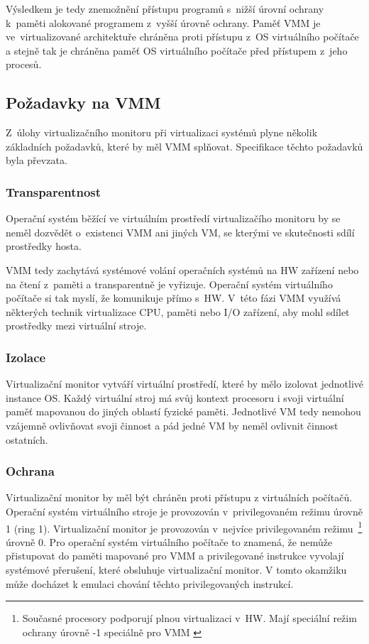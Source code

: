 Výsledkem je tedy znemožnění přístupu programů s~nižší úrovní ochrany k~paměti alokované programem z~vyšší úrovně ochrany.
Paměť VMM je ve~virtualizované architektuře chráněna proti přístupu z~OS virtuálního počítače a stejně tak je chráněna paměť
OS virtuálního počítače před přístupem z~jeho procesů.
\subsection{Požadavky na VMM}
\label{chapter:virtualization:vmm:demands}
Z~úlohy virtualizačního monitoru při virtualizaci systémů plyne několik základních požadavků, které by měl VMM splňovat.
Specifikace \cite{cvut:presentation:virt2} těchto požadavků byla převzata.
\subsubsection{Transparentnost}
\label{chapter:virtualization:vmm:demands:transparency}
Operační systém běžící ve virtuálním prostředí virtualizačího monitoru by se neměl dozvědět o~existenci VMM ani jiných VM,
se kterými ve skutečnosti sdílí prostředky hosta.

VMM tedy zachytává systémové volání operačních systémů na HW zařízení nebo na čtení z~paměti a transparentně je vyřizuje.
Operační systém virtuálního počítače si tak myslí, že komunikuje přímo s~HW. V~této fázi VMM využívá některých technik virtualizace
CPU, paměti nebo I/O zařízení, aby mohl sdílet prostředky mezi virtuální stroje.
\subsubsection{Izolace}
\label{chapter:virtualization:vmm:demands:isolation}
Virtualizační monitor vytváří virtuální prostředí, které by mělo izolovat jednotlivé instance OS. Každý virtuální stroj má 
svůj kontext procesoru i svoji virtuální paměť mapovanou do jiných oblastí fyzické paměti. Jednotlivé VM tedy nemohou
vzájemně ovlivňovat svoji činnost a pád jedné VM by neměl ovlivnit činnost ostatních.
\subsubsection{Ochrana}
\label{chapter:virtualization:vmm:demands:access}
Virtualizační monitor by měl být chráněn proti přístupu z virtuálních počítačů. Operační systém virtuálního stroje 
je provozován v~privilegovaném režimu úrovně 1 (ring 1). Virtualizační monitor je provozován v~nejvíce privilegovaném režimu~\footnote[1]{Současné procesory podporují plnou virtualizaci v~HW. Mají speciální  režim ochrany úrovně -1 speciálně pro VMM \cite{cvut:presentation:virt2}}
úrovně 0. Pro operační systém virtuálního počítače to znamená, že nemůže přistupovat do paměti mapované pro VMM a privilegované
instrukce vyvolají systémové přerušení, které obsluhuje virtualizační monitor. V tomto okamžiku může docházet k emulaci chování
těchto privilegovaných instrukcí. 
